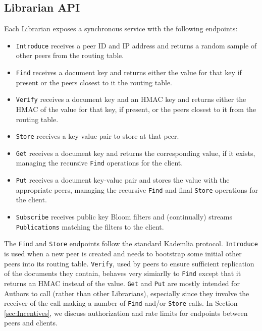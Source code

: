 \documentclass[10pt]{article}
\newcommand{\ttt}[1]{\texttt{#1}}
\def\Put{\ttt{Put}}
\def\Get{\ttt{Get}}
\begin{document}
\subsection{Librarian API}
\label{sec:API}
Each Librarian exposes a synchronous service with the following endpoints:
\begin{itemize}
	\item \ttt{Introduce} receives a peer ID and IP address and returns a random sample of other peers from the routing table.
	\item \ttt{Find} receives a document key and returns either the value for that key if present or the peers closest to it the routing table.
	\item \ttt{Verify} receives a document key and an HMAC key and returns either the HMAC of the value for that key, if present, or the peers closest to it from the routing table.
	\item \ttt{Store} receives a key-value pair to store at that peer.
	\item \ttt{Get} receives a document key and returns the corresponding value, if it exists, managing the recursive \texttt{Find} operations for the client.
	\item \ttt{Put} receives a document key-value pair and stores the value with the appropriate peers, managing the recursive \texttt{Find} and final \ttt{Store} operations for the client.
	\item \ttt{Subscribe} receives public key Bloom filters and (continually) streams \ttt{Publications} matching the filters to the client.
\end{itemize}

The \ttt{Find} and \texttt{Store} endpoints follow the standard Kademlia protocol. \texttt{Introduce} is used when a new peer is created and needs to bootstrap some initial other peers into its routing table. \texttt{Verify}, used by peers to ensure sufficient replication of the documents they contain, behaves very simiarlly to \texttt{Find} except that it returns an HMAC instead of the value. \Get{} and \Put{} are mostly intended for Authors to call (rather than other Librarians), especially since they involve the receiver of the call making a number of \texttt{Find} and/or \texttt{Store} calls. In Section \ref{sec:Incentives}, we discuss authorization and rate limits for endpoints between peers and clients.
\end{document}
